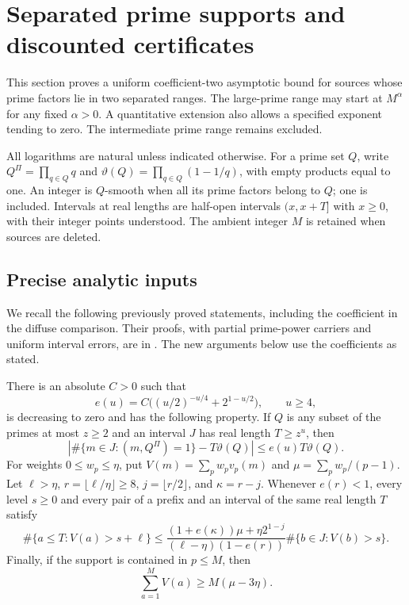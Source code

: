 \section{Separated prime supports and discounted certificates}
\label{ss:section}

This section proves a uniform coefficient-two asymptotic bound for sources
whose prime factors lie in two separated ranges. The large-prime range may
start at $M^\alpha$ for any fixed $\alpha>0$. A quantitative extension also
allows a specified exponent tending to zero. The intermediate prime range
remains excluded.

All logarithms are natural unless indicated otherwise. For a prime set $Q$,
write $Q^\Pi=\prod_{q\in Q}q$ and
$\vartheta(Q)=\prod_{q\in Q}(1-1/q)$, with empty products equal to one.
An integer is $Q$-smooth when all its prime factors belong to $Q$;
one is included. Intervals at real lengths are half-open intervals
$(x,x+T]$ with $x\ge0$, with their integer points understood.
The ambient integer $M$ is retained when sources are deleted.

\subsection{Precise analytic inputs}

We recall the following previously proved statements, including the
coefficient in the diffuse comparison. Their proofs, with partial
prime-power carriers and uniform interval errors, are in \cite{Synthesis}.
The new arguments below use the coefficients as stated.

\begin{lemma}
\label{ss:inputs}
There is an absolute $C>0$ such that
\[
 e(u)=C\bigl((u/2)^{-u/4}+2^{1-u/2}\bigr),\qquad u\ge4,
\]
is decreasing to zero and has the following property. If $Q$ is any
subset of the primes at most $z\ge2$ and an interval $J$ has real length
$T\ge z^u$, then
\[
 \left|\#\{m\in J:(m,Q^\Pi)=1\}-T\vartheta(Q)\right|
 \le e(u)T\vartheta(Q).
 \tag{S}
\]
For weights $0\le w_p\le\eta$, put
$V(m)=\sum_pw_pv_p(m)$ and $\mu=\sum_pw_p/(p-1)$.
Let $\ell>\eta$, $r=\lfloor\ell/\eta\rfloor\ge8$,
$j=\lfloor r/2\rfloor$, and $\kappa=r-j$.
Whenever $e(r)<1$, every level $s\ge0$ and every pair of a prefix and
an interval of the same real length $T$ satisfy
\begin{equation}
 \#\{a\le T:V(a)>s+\ell\}
 \le
 \frac{(1+e(\kappa))\mu+\eta2^{1-j}}
      {(\ell-\eta)(1-e(r))}
 \#\{b\in J:V(b)>s\}.
 \label{ss:diffuse-ratio}
\end{equation}
Finally, if the support is contained in $p\le M$, then
\begin{equation}
 \sum_{a=1}^M V(a)\ge M(\mu-3\eta).
 \label{ss:small-mean-error}
\end{equation}
\end{lemma}

